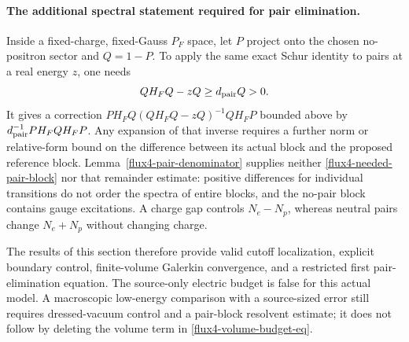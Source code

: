 \paragraph{The additional spectral statement required for pair elimination.}
Inside a fixed-charge, fixed-Gauss $P_F$ space, let $P$ project onto
the chosen no-positron sector and $Q=1-P$.  To apply the same exact
Schur identity to pairs at a real energy $z$, one needs
\begin{equation}
 QH_FQ-zQ\ge d_{\rm pair}Q>0.
 \label{flux4-needed-pair-block}
\end{equation}
It gives a correction
$PH_FQ(QH_FQ-zQ)^{-1}QH_FP$ bounded above by
$d_{\rm pair}^{-1}PH_FQH_FP$.  Any expansion of that inverse
requires a further norm or relative-form bound on the difference
between its actual block and the proposed reference block.
Lemma~\ref{flux4-pair-denominator} supplies neither
\eqref{flux4-needed-pair-block} nor that remainder estimate:
positive differences for individual transitions do not order the
spectra of entire blocks, and the no-pair block contains gauge
excitations.  A charge gap controls $N_e-N_p$, whereas neutral
pairs change $N_e+N_p$ without changing charge.

The results of this section therefore provide valid cutoff
localization, explicit boundary control, finite-volume Galerkin
convergence, and a restricted first pair-elimination equation.
The source-only electric budget is false for this actual model.
A macroscopic low-energy comparison with a source-sized error still
requires dressed-vacuum control and a pair-block resolvent estimate;
it does not follow by deleting the volume term in
\eqref{flux4-volume-budget-eq}.
